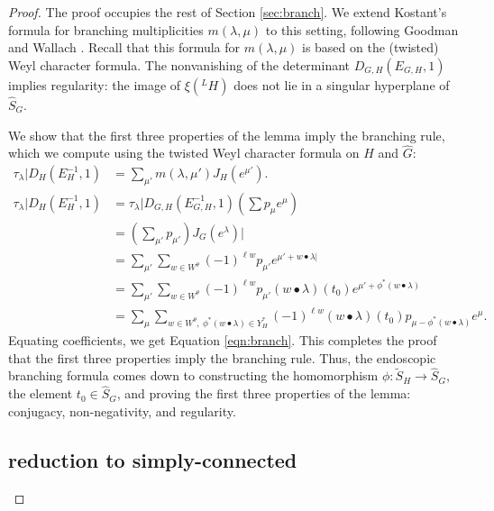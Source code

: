 \begin{proof}
The proof occupies the rest of Section \ref{sec:branch}.
We  extend Kostant's formula for branching multiplicities $m(\lambda,\mu)$ to this setting, following
 Goodman and Wallach \cite[\S8.2.2]{goodman}.   
Recall that this formula for $m(\lambda,\mu)$ is based on the (twisted) Weyl character formula.
The nonvanishing of the determinant
$D_{G,H}(E_{G,H},1)$ implies regularity:  the image of $\xi({}^LH)$ does not lie in a singular hyperplane
of $\hat S_G$.


We show that the first three properties of the lemma imply the branching rule, which we compute
using the twisted Weyl character formula on $\hat H$ and $\hat G$:
\begin{align*}
\tau_\lambda| D_H(E_H^{-1},1)&= \sum_{\mu'} m(\lambda,{\mu'}) J_H(e^{\mu'}).\\
\tau_\lambda| D_H(E_H^{-1},1) &= \tau_\lambda| D_{G,H}(E^{-1}_{G,H},1)(\sum p_\mu e^\mu)\\
  &= (\sum_{\mu'} p_{\mu'}) J_G(e^\lambda)|\\
  &= \sum_{\mu'} \sum_{w\in W^\theta} (-1)^{\ell w} p_{\mu'} e^{\mu'+w\bullet \lambda|}\\
  &= \sum_{\mu'} \sum_{w\in W^\theta} (-1)^{\ell w} p_{\mu'} ({w\bullet\lambda})(t_0) e^{\mu'+\phi^*(w\bullet \lambda)}\\
  &= \sum_\mu \sum_{w\in W^\theta,~\phi^*({w\bullet\lambda})\in Y^*_H} (-1)^{\ell w} ({w\bullet\lambda})(t_0) p_{\mu - \phi^*({w\bullet \lambda})} e^\mu.
\end{align*}
Equating coefficients, we get Equation \ref{eqn:branch}.
This completes the proof that the first three properties imply the branching rule.
Thus, the endoscopic branching formula comes down to constructing 
the homomorphism $\phi:\tilde S_H\to \hat S_G$,
the element $t_0\in \hat S_G$, 
and proving the first three properties of the lemma: conjugacy, non-negativity, and regularity.

\subsection{reduction to simply-connected}



\end{proof}
